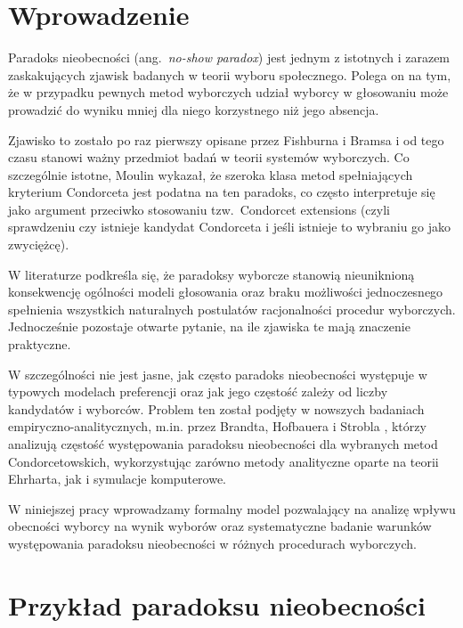 \documentclass[12pt,a4paper]{mwrep}
\begin{document}
	\section{Wprowadzenie}
	
	Paradoks nieobecności (ang.~\emph{no-show paradox}) jest jednym z istotnych i zarazem zaskakujących zjawisk badanych w teorii wyboru społecznego. Polega on na tym, że w przypadku pewnych metod wyborczych udział wyborcy w głosowaniu może prowadzić do wyniku mniej dla niego korzystnego niż jego absencja.
	
	Zjawisko to zostało po raz pierwszy opisane przez Fishburna i Bramsa \cite{fishburn1983} i od tego czasu stanowi ważny przedmiot badań w teorii systemów wyborczych. Co szczególnie istotne, Moulin \cite{moulin1988} wykazał, że szeroka klasa metod spełniających kryterium Condorceta jest podatna na ten paradoks, co często interpretuje się jako argument przeciwko stosowaniu tzw.~Condorcet extensions (czyli sprawdzeniu czy istnieje kandydat Condorceta i jeśli istnieje to wybraniu go jako zwyciężcę).
	
	W literaturze podkreśla się, że paradoksy wyborcze stanowią nieuniknioną konsekwencję ogólności modeli głosowania oraz braku możliwości jednoczesnego spełnienia wszystkich naturalnych postulatów racjonalności procedur wyborczych. Jednocześnie pozostaje otwarte pytanie, na ile zjawiska te mają znaczenie praktyczne.
	
	W szczególności nie jest jasne, jak często paradoks nieobecności występuje w typowych modelach preferencji oraz jak jego częstość zależy od liczby kandydatów i wyborców. Problem ten został podjęty w nowszych badaniach empiryczno-analitycznych, m.in. przez Brandta, Hofbauera i Strobla \cite{brandt2017nsp}, którzy analizują częstość występowania paradoksu nieobecności dla wybranych metod Condorcetowskich, wykorzystując zarówno metody analityczne oparte na teorii Ehrharta, jak i symulacje komputerowe.
	
	W niniejszej pracy wprowadzamy formalny model pozwalający na analizę wpływu obecności wyborcy na wynik wyborów oraz systematyczne badanie warunków występowania paradoksu nieobecności w różnych procedurach wyborczych.
	
	\section{Przykład paradoksu nieobecności}
	
\end{document}
